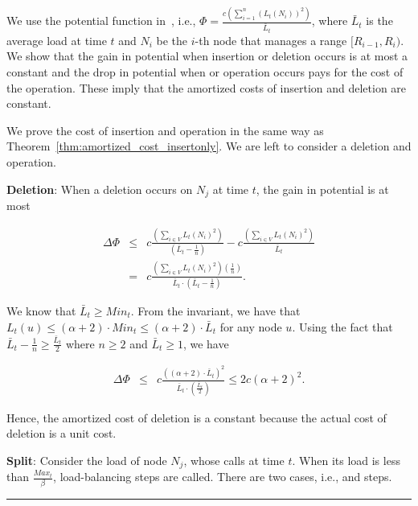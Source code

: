 \documentclass[a4paper]{article}
\newenvironment{proof}{{\bf Proof:}}{\hfill\rule{1.5mm}{3mm}\vspace{0.1in}}
\begin{document}
\begin{proof}
  We use the  potential function in~\cite{GanesanBGM04-vldb}, i.e., $\Phi=
  \frac{c(\sum^{n}_{i=1}(L_t(N_i))^2)}{\bar{L}_t}$, where $\bar{L}_t$ is the
  average load at time $t$ and $N_i$ be the $i$-th node that manages
  a range $[R_{i-1}, R_i)$. We show that the gain in potential
  when insertion or deletion occurs is at most a constant and the drop
  in potential when {\minbalance} or {\split} operation occurs pays
  for the cost of the operation. These imply that the amortized costs
  of insertion and deletion are constant.

  We prove the cost of insertion and {\minbalance} operation in the
  same way as Theorem~\ref{thm:amortized_cost_insertonly}. We are left
  to consider a deletion and {\split} operation.

{\bf Deletion}: When a deletion occurs on $N_j$ at time $t$, the
gain in potential is at most

\begin{eqnarray*}
  \Delta\Phi & \leq &c\frac{\left(\sum_{i\in
        V}{L_t(N_i)^2}\right)}{\left(\bar{L}_t-
      \frac{1}{n}\right)}-c\frac{\left(\sum_{i\in
        V}{L_t(N_i)^2}\right)}{\bar{L}_t}\\ 
  &=&c\frac{\left(\sum_{i\in V}{L_t(N_i)^2}\right)(\frac{1}{n})}{\bar{L}_t\cdot\left(\bar{L}_t-\frac{1}{n}\right)}.
  \end{eqnarray*}

  We know that $\bar{L}_t\geq Min_t$. From the invariant, we have that
  $L_t(u)\leq(\alpha+2)\cdot Min_t\leq(\alpha+2)\cdot\bar{L}_t$ for any node $u$.  Using the
  fact that $\bar{L}_t-\frac{1}{n} \geq \frac{\bar{L}_t}{2}$ where $n \geq 2$ and
  $\bar{L}_t \geq 1$, we have

  \begin{eqnarray*}
\Delta\Phi& \leq&
c\frac{\left((\alpha+2)\cdot\bar{L}_t\right)^2}{\bar{L}_t\cdot\left(\frac{\bar{L}_t}{2}\right)}
\leq 2c(\alpha+2)^2.
  \end{eqnarray*}

  Hence, the amortized cost of deletion is a constant because the actual cost
  of deletion is a unit cost.

  {\bf Split}: Consider the load of node $N_j$, whose calls {\split}
  at time $t$. When its load is less than $\frac{Max_t}{\beta}$, 
  load-balancing steps are called.  There are two cases, i.e.,
  {\splitnbr} and {\splitmax} steps.


\end{proof}
\end{document}
